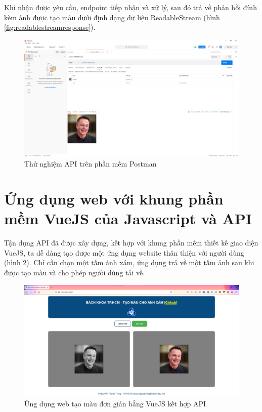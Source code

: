 \documentclass[a4paper, 12pt]{report}
\begin{document}
Khi nhận được yêu cầu, endpoint tiếp nhận và xử lý, sau đó trả về phản hồi đính kèm ảnh được tạo màu dưới định dạng dữ liệu ReadableStream (hình \ref{fig:readablestreamresponse}).

\begin{figure}[!h]
\centering
\includegraphics[width=15cm]{images/postman.png}
\caption{Thử nghiệm API trên phần mềm Postman}
\label{fig:demoinpostman}
\end{figure}

\section{Ứng dụng web với khung phần mềm VueJS của Javascript và API}

Tận dụng API đã được xây dựng, kết hợp với khung phần mềm thiết kế giao diện VueJS, ta dễ dàng tạo được một ứng dụng website thân thiện với người dùng (hình \ref{fig:webapp}).
Chỉ cần chọn một tấm ảnh xám, ứng dụng trả về một tấm ảnh sau khi được tạo màu và cho phép người dùng tải về.

\begin{figure}[!h]
\centering
\includegraphics[width=15cm]{images/demoweb.png}
\caption{Ứng dụng web tạo màu đơn giản bằng VueJS kết hợp API}
\label{fig:webapp}
\end{figure}
\end{document}
